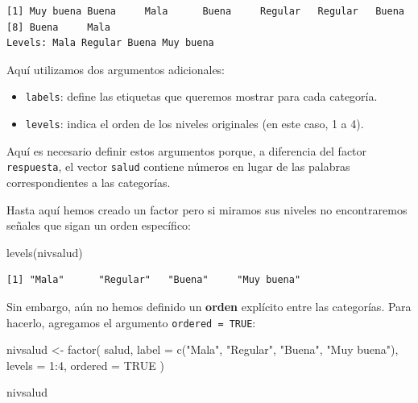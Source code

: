 \documentclass[
  spanish,
  letterpaper,
  DIV=11,
  numbers=noendperiod]{scrreprt}
\newenvironment{Shaded}{\begin{snugshade}}{\end{snugshade}}
\newcommand{\AttributeTok}[1]{\textcolor[rgb]{0.40,0.45,0.13}{#1}}
\newcommand{\ConstantTok}[1]{\textcolor[rgb]{0.56,0.35,0.01}{#1}}
\newcommand{\DecValTok}[1]{\textcolor[rgb]{0.68,0.00,0.00}{#1}}
\newcommand{\FunctionTok}[1]{\textcolor[rgb]{0.28,0.35,0.67}{#1}}
\newcommand{\NormalTok}[1]{\textcolor[rgb]{0.00,0.23,0.31}{#1}}
\newcommand{\OtherTok}[1]{\textcolor[rgb]{0.00,0.23,0.31}{#1}}
\newcommand{\SpecialCharTok}[1]{\textcolor[rgb]{0.37,0.37,0.37}{#1}}
\newcommand{\StringTok}[1]{\textcolor[rgb]{0.13,0.47,0.30}{#1}}
\begin{document}
\begin{verbatim}
[1] Muy buena Buena     Mala      Buena     Regular   Regular   Buena    
[8] Buena     Mala     
Levels: Mala Regular Buena Muy buena
\end{verbatim}

Aquí utilizamos dos argumentos adicionales:

\begin{itemize}
\item
  \texttt{labels}: define las etiquetas que queremos mostrar para cada
  categoría.
\item
  \texttt{levels}: indica el orden de los niveles originales (en este
  caso, 1 a 4).
\end{itemize}

Aquí es necesario definir estos argumentos porque, a diferencia del
factor \texttt{respuesta}, el vector \texttt{salud} contiene números en
lugar de las palabras correspondientes a las categorías.

Hasta aquí hemos creado un factor pero si miramos sus niveles no
encontraremos señales que sigan un orden específico:

\begin{Shaded}
\begin{Highlighting}[]
\FunctionTok{levels}\NormalTok{(nivsalud)}
\end{Highlighting}
\end{Shaded}

\begin{verbatim}
[1] "Mala"      "Regular"   "Buena"     "Muy buena"
\end{verbatim}

Sin embargo, aún no hemos definido un \textbf{orden} explícito entre las
categorías. Para hacerlo, agregamos el argumento
\texttt{ordered\ =\ TRUE}:

\begin{Shaded}
\begin{Highlighting}[]
\NormalTok{nivsalud }\OtherTok{\textless{}{-}} \FunctionTok{factor}\NormalTok{(}
\NormalTok{  salud,}
  \AttributeTok{label =} \FunctionTok{c}\NormalTok{(}\StringTok{"Mala"}\NormalTok{, }\StringTok{"Regular"}\NormalTok{, }\StringTok{"Buena"}\NormalTok{, }\StringTok{"Muy buena"}\NormalTok{),}
  \AttributeTok{levels =} \DecValTok{1}\SpecialCharTok{:}\DecValTok{4}\NormalTok{,}
  \AttributeTok{ordered =} \ConstantTok{TRUE}
\NormalTok{)}

\NormalTok{nivsalud}
\end{Highlighting}
\end{Shaded}
\end{document}
